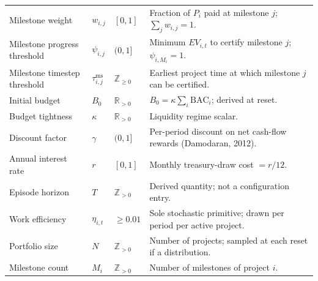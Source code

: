 \documentclass[10pt,border=6pt]{standalone}
\begin{document}
\begin{minipage}{170mm}
\begin{tabularx}{\linewidth}{l l l >{\raggedright\arraybackslash}X}
Milestone weight            & $w_{i,j}$                  & $[0,1]$               & Fraction of $P_i$ paid at milestone $j$; $\sum_j w_{i,j} = 1$. \\
Milestone progress threshold& $\psi_{i,j}$               & $(0,1]$               & Minimum $EV_{i,t}$ to certify milestone $j$; $\psi_{i,M_i} = 1$. \\
Milestone timestep threshold& $\tau^{\mathrm{ms}}_{i,j}$ & $\mathbb{Z}_{\geq 0}$ & Earliest project time at which milestone $j$ can be certified. \\
Initial budget              & $B_0$                      & $\mathbb{R}_{>0}$     & $B_0 = \kappa \sum_i \mathrm{BAC}_i$; derived at reset. \\
Budget tightness            & $\kappa$                   & $\mathbb{R}_{>0}$     & Liquidity regime scalar. \\
Discount factor             & $\gamma$                   & $(0,1]$               & Per-period discount on net cash-flow rewards (Damodaran, 2012). \\
Annual interest rate        & $r$                        & $[0,1]$               & Monthly treasury-draw cost $= r/12$. \\
Episode horizon             & $T$                        & $\mathbb{Z}_{>0}$     & Derived quantity; not a configuration entry. \\
Work efficiency             & $\eta_{i,t}$               & ${\geq}0.01$          & Sole stochastic primitive; drawn per period per active project. \\
Portfolio size              & $N$                        & $\mathbb{Z}_{>0}$     & Number of projects; sampled at each reset if a distribution. \\
Milestone count             & $M_i$                      & $\mathbb{Z}_{>0}$     & Number of milestones of project $i$. \\
\bottomrule
\end{tabularx}
\end{minipage}
\end{document}
